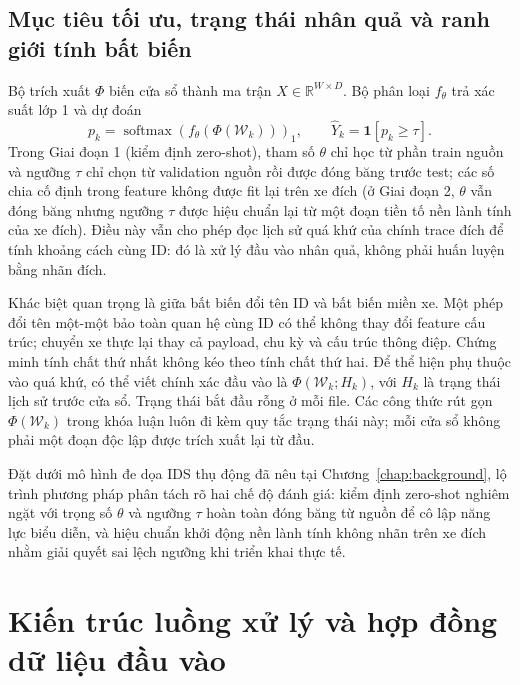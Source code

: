 \documentclass[12pt, a4paper, reqno, oneside]{book}
\begin{document}
\subsection{Mục tiêu tối ưu, trạng thái nhân quả và ranh giới tính bất biến}
Bộ trích xuất $\Phi$ biến cửa sổ thành ma trận $X\in\mathbb{R}^{W\times D}$. Bộ phân loại $f_\theta$ trả xác suất lớp 1 và dự đoán
\begin{equation}
p_k=\operatorname{softmax}(f_\theta(\Phi(\mathcal{W}_k)))_1,
\qquad \widehat Y_k=\mathbf{1}[p_k\geq\tau].
\end{equation}
Trong Giai đoạn 1 (kiểm định zero-shot), tham số $\theta$ chỉ học từ phần train nguồn và ngưỡng $\tau$ chỉ chọn từ validation nguồn rồi được đóng băng trước test; các số chia cố định trong feature không được fit lại trên xe đích (ở Giai đoạn 2, $\theta$ vẫn đóng băng nhưng ngưỡng $\tau$ được hiệu chuẩn lại từ một đoạn tiền tố nền lành tính của xe đích). Điều này vẫn cho phép đọc lịch sử quá khứ của chính trace đích để tính khoảng cách cùng ID: đó là xử lý đầu vào nhân quả, không phải huấn luyện bằng nhãn đích.

Khác biệt quan trọng là giữa bất biến đổi tên ID và bất biến miền xe. Một phép đổi tên một-một bảo toàn quan hệ cùng ID có thể không thay đổi feature cấu trúc; chuyển xe thực lại thay cả payload, chu kỳ và cấu trúc thông điệp. Chứng minh tính chất thứ nhất không kéo theo tính chất thứ hai.
Để thể hiện phụ thuộc vào quá khứ, có thể viết chính xác đầu vào là $\Phi(\mathcal W_k;H_k)$, với $H_k$ là trạng thái lịch sử trước cửa sổ. Trạng thái bắt đầu rỗng ở mỗi file. Các công thức rút gọn $\Phi(\mathcal W_k)$ trong khóa luận luôn đi kèm quy tắc trạng thái này; mỗi cửa sổ không phải một đoạn độc lập được trích xuất lại từ đầu.

Đặt dưới mô hình đe dọa IDS thụ động đã nêu tại Chương~\ref{chap:background}, lộ trình phương pháp phân tách rõ hai chế độ đánh giá: kiểm định zero-shot nghiêm ngặt với trọng số $\theta$ và ngưỡng $\tau$ hoàn toàn đóng băng từ nguồn để cô lập năng lực biểu diễn, và hiệu chuẩn khởi động nền lành tính không nhãn trên xe đích nhằm giải quyết sai lệch ngưỡng khi triển khai thực tế.

\section{Kiến trúc luồng xử lý và hợp đồng dữ liệu đầu vào}
\end{document}

